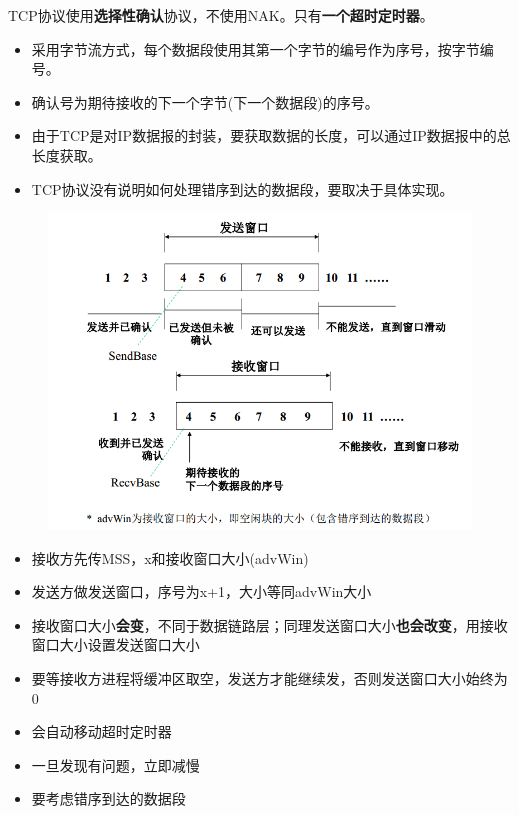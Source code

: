 TCP协议使用\textbf{选择性确认}协议，不使用NAK。只有\textbf{一个超时定时器}。
\begin{itemize}
\item 采用字节流方式，每个数据段使用其第一个字节的编号作为序号，按字节编号。
\item 确认号为期待接收的下一个字节(下一个数据段)的序号。
\item 由于TCP是对IP数据报的封装，要获取数据的长度，可以通过IP数据报中的总长度获取。
\item TCP协议没有说明如何处理错序到达的数据段，要取决于具体实现。
\end{itemize}

\begin{figure}[H]
    \centering
    \includegraphics[width=0.8\linewidth]{fig/TCP-window.PNG}
\end{figure}

\begin{itemize}
\item 接收方先传MSS，x和接收窗口大小(advWin)
\item 发送方做发送窗口，序号为x+1，大小等同advWin大小
\item 接收窗口大小\textbf{会变}，不同于数据链路层；同理发送窗口大小\textbf{也会改变}，用接收窗口大小设置发送窗口大小
\item 要等接收方进程将缓冲区取空，发送方才能继续发，否则发送窗口大小始终为0
\item 会自动移动超时定时器
\item 一旦发现有问题，立即减慢
\item 要考虑错序到达的数据段
\end{itemize}